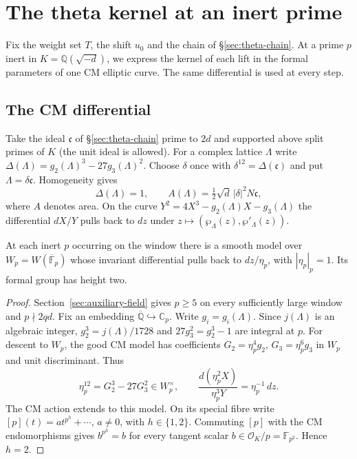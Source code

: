 \section{The theta kernel at an inert prime}\label{sec:inert-kernel}

Fix the weight set $T$, the shift $u_0$ and the chain of
\S\ref{sec:theta-chain}. At a prime $p$ inert in $K=\mathbb Q(\sqrt{-d})$,
we express the kernel of each lift in the formal parameters of one CM
elliptic curve. The same differential is used at every step.

\subsection{The CM differential}

Take the ideal $\mathfrak c$ of \S\ref{sec:theta-chain} prime to $2d$ and
supported above split primes of $K$ (the unit ideal is allowed).
For a complex lattice $\Lambda$ write
$\Delta(\Lambda)=g_2(\Lambda)^3-27g_3(\Lambda)^2$.
Choose $\delta$ once with $\delta^{12}=\Delta(\mathfrak c)$ and put
$\Lambda=\delta\mathfrak c$. Homogeneity gives
\[
  \Delta(\Lambda)=1,\qquad
  A(\Lambda)=\tfrac12\sqrt d\,|\delta|^2 N\mathfrak c ,
\]
where $A$ denotes area. On the curve
$Y^2=4X^3-g_2(\Lambda)X-g_3(\Lambda)$ the differential $dX/Y$ pulls
back to $dz$ under $z\mapsto(\wp_\Lambda(z),\wp'_\Lambda(z))$.

\begin{lemma}\label{lem:inert-model}
At each inert $p$ occurring on the window there is a smooth model
over $W_p=W(\overline{\mathbb F}_p)$ whose invariant differential
pulls back to $dz/\eta_p$, with $|\eta_p|_p=1$.
Its formal group has height two.
\end{lemma}

\begin{proof}
Section~\ref{sec:auxiliary-field} gives $p\ge5$ on every sufficiently
large window and $p\nmid 2qd$. Fix an embedding
$\overline{\mathbb Q}\hookrightarrow\mathbb C_p$.
Write $g_i=g_i(\Lambda)$. Since $j(\Lambda)$ is an algebraic integer,
$g_2^3=j(\Lambda)/1728$ and $27g_3^2=g_2^3-1$ are integral at $p$.
For descent to $W_p$, the good CM model
\citep[Proposition~8.4]{adriazola-grh} has coefficients
$G_2=\eta_p^4g_2$, $G_3=\eta_p^6g_3$ in $W_p$ and unit discriminant.
Thus
\[
  \eta_p^{12}=G_2^3-27G_3^2\in W_p^\times,\qquad
  \frac{d(\eta_p^2 X)}{\eta_p^3Y}=\eta_p^{-1}\,dz .
\]
The CM action extends to this model. On its special fibre write
$[p](t)=a t^{p^h}+\cdots$, $a\ne0$, with $h\in\{1,2\}$.
Commuting $[p]$ with the CM endomorphisms gives $b^{p^h}=b$
for every tangent scalar $b\in\mathcal O_K/p=\mathbb F_{p^2}$.
Hence $h=2$.
\end{proof}

